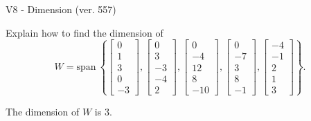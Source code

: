 \begin{exercise}
  \begin{exerciseTitle}V8 - Dimension (ver. 557)\end{exerciseTitle}
  \begin{exerciseStatement}
    Explain how to find the dimension of 
\[W=\mathrm{span}\ \left\{\left[\begin{array}{r}
0 \\
1 \\
3 \\
0 \\
-3
\end{array}\right] , \left[\begin{array}{r}
0 \\
3 \\
-3 \\
-4 \\
2
\end{array}\right] , \left[\begin{array}{r}
0 \\
-4 \\
12 \\
8 \\
-10
\end{array}\right] , \left[\begin{array}{r}
0 \\
-7 \\
3 \\
8 \\
-1
\end{array}\right] , \left[\begin{array}{r}
-4 \\
-1 \\
2 \\
1 \\
3
\end{array}\right]\right\}.\]



  \end{exerciseStatement}
  \begin{exerciseAnswer}
   The dimension of \(W\) is  \(3\).
  


  \end{exerciseAnswer}
\end{exercise}